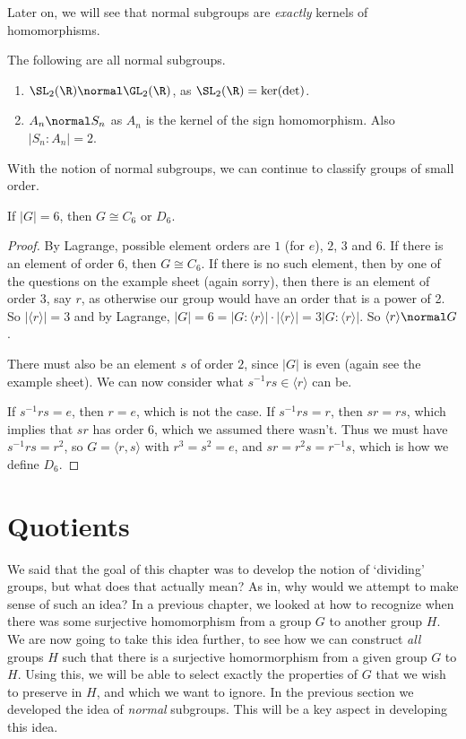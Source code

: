 \documentclass[a4]{scrreprt}
\begin{document}
Later on, we will see that normal subgroups are \emph{exactly} kernels of homomorphisms.

\begin{example}
	The following are all normal subgroups.
	\begin{enumerate}
		\item $\SL_2(\R) \normal \GL_2(\R)$, as $\SL_2(\R) = \ker(\det)$.
		\item $A_n \normal S_n$ as $A_n$ is the kernel of the sign homomorphism. Also $|S_n : A_n| = 2$.
	\end{enumerate}
\end{example}

With the notion of normal subgroups, we can continue to classify groups of small order.

\begin{proposition}
	If $|G| = 6$, then $G \cong C_6$ or $D_6$.
\end{proposition}
\begin{proof}
	By Lagrange, possible element orders are $1$ (for $e$), $2$, $3$ and $6$. If there is an element of order 6, then $G \cong C_6$. If there is no such element, then by one of the questions on the example sheet (again sorry), then there is an element of order $3$, say $r$, as otherwise our group would have an order that is a power of 2. So $|\langle r \rangle| = 3$ and by Lagrange, $|G| = 6 = |G: \langle r \rangle| \cdot |\langle r \rangle| = 3 |G: \langle r \rangle|$. So $\langle r \rangle \normal G$.

	There must also be an element $s$ of order $2$, since $|G|$ is even (again see the example sheet). We can now consider what $s^{-1} r s \in \langle r \rangle$ can be.

	If $s^{-1} r s = e$, then $r = e$, which is not the case. If $s^{-1} r s = r$, then $sr = rs$, which implies that $sr$ has order 6, which we assumed there wasn't. Thus we must have $s^{-1} r s = r^2$, so $G = \langle r, s \rangle$ with $r^3 = s^2 = e$, and $sr = r^2 s = r^{-1}s$, which is how we define $D_6$.
\end{proof}

\section{Quotients}

We said that the goal of this chapter was to develop the notion of `dividing' groups, but what does that actually mean? As in, why would we attempt to make sense of such an idea?
In a previous chapter, we looked at how to recognize when there was some surjective homomorphism from a group $G$ to another group $H$.
We are now going to take this idea further, to see how we can construct \emph{all} groups $H$ such that there is a surjective homormorphism from a given group $G$ to $H$.
Using this, we will be able to select exactly the properties of $G$ that we wish to preserve in $H$, and which we want to ignore.
In the previous section we developed the idea of \emph{normal} subgroups. This will be a key aspect in developing this idea.
\end{document}
